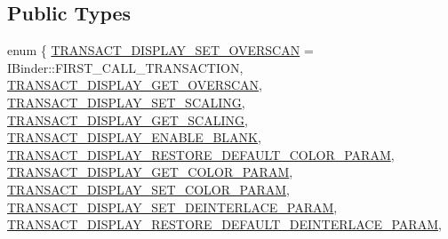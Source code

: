 \subsection*{Public Types}
\begin{DoxyCompactItemize}
\item 
enum \{ \newline
\mbox{\hyperlink{classhwcomposer_1_1BpControls_a057cb6d771c68da065640c49e3742446a985ef11557835be6b215a6b481cc8975}{T\+R\+A\+N\+S\+A\+C\+T\+\_\+\+D\+I\+S\+P\+L\+A\+Y\+\_\+\+S\+E\+T\+\_\+\+O\+V\+E\+R\+S\+C\+AN}} = I\+Binder\+:\+:F\+I\+R\+S\+T\+\_\+\+C\+A\+L\+L\+\_\+\+T\+R\+A\+N\+S\+A\+C\+T\+I\+ON, 
\mbox{\hyperlink{classhwcomposer_1_1BpControls_a057cb6d771c68da065640c49e3742446acfb53ecdb379884e8843788c2a312e8c}{T\+R\+A\+N\+S\+A\+C\+T\+\_\+\+D\+I\+S\+P\+L\+A\+Y\+\_\+\+G\+E\+T\+\_\+\+O\+V\+E\+R\+S\+C\+AN}}, 
\mbox{\hyperlink{classhwcomposer_1_1BpControls_a057cb6d771c68da065640c49e3742446acd6fb8651f02533f7f7a92d0642d9a0d}{T\+R\+A\+N\+S\+A\+C\+T\+\_\+\+D\+I\+S\+P\+L\+A\+Y\+\_\+\+S\+E\+T\+\_\+\+S\+C\+A\+L\+I\+NG}}, 
\mbox{\hyperlink{classhwcomposer_1_1BpControls_a057cb6d771c68da065640c49e3742446ad8d27d03f7cca04781cb7c481a1a91d6}{T\+R\+A\+N\+S\+A\+C\+T\+\_\+\+D\+I\+S\+P\+L\+A\+Y\+\_\+\+G\+E\+T\+\_\+\+S\+C\+A\+L\+I\+NG}}, 
\newline
\mbox{\hyperlink{classhwcomposer_1_1BpControls_a057cb6d771c68da065640c49e3742446a6623581a2b88fb17369dd632a20106d4}{T\+R\+A\+N\+S\+A\+C\+T\+\_\+\+D\+I\+S\+P\+L\+A\+Y\+\_\+\+E\+N\+A\+B\+L\+E\+\_\+\+B\+L\+A\+NK}}, 
\mbox{\hyperlink{classhwcomposer_1_1BpControls_a057cb6d771c68da065640c49e3742446a15a087c4d488f967b1293b18951a6c02}{T\+R\+A\+N\+S\+A\+C\+T\+\_\+\+D\+I\+S\+P\+L\+A\+Y\+\_\+\+R\+E\+S\+T\+O\+R\+E\+\_\+\+D\+E\+F\+A\+U\+L\+T\+\_\+\+C\+O\+L\+O\+R\+\_\+\+P\+A\+R\+AM}}, 
\mbox{\hyperlink{classhwcomposer_1_1BpControls_a057cb6d771c68da065640c49e3742446a218cf0d49257af27d4916bbcf7974e42}{T\+R\+A\+N\+S\+A\+C\+T\+\_\+\+D\+I\+S\+P\+L\+A\+Y\+\_\+\+G\+E\+T\+\_\+\+C\+O\+L\+O\+R\+\_\+\+P\+A\+R\+AM}}, 
\mbox{\hyperlink{classhwcomposer_1_1BpControls_a057cb6d771c68da065640c49e3742446a02754bed54f3e948595d365863e6ff6c}{T\+R\+A\+N\+S\+A\+C\+T\+\_\+\+D\+I\+S\+P\+L\+A\+Y\+\_\+\+S\+E\+T\+\_\+\+C\+O\+L\+O\+R\+\_\+\+P\+A\+R\+AM}}, 
\newline
\mbox{\hyperlink{classhwcomposer_1_1BpControls_a057cb6d771c68da065640c49e3742446a32c72f6f1679760b231c841184d5420d}{T\+R\+A\+N\+S\+A\+C\+T\+\_\+\+D\+I\+S\+P\+L\+A\+Y\+\_\+\+S\+E\+T\+\_\+\+D\+E\+I\+N\+T\+E\+R\+L\+A\+C\+E\+\_\+\+P\+A\+R\+AM}}, 
\mbox{\hyperlink{classhwcomposer_1_1BpControls_a057cb6d771c68da065640c49e3742446a481d6c71408ba43adf692d5e11aa7fd7}{T\+R\+A\+N\+S\+A\+C\+T\+\_\+\+D\+I\+S\+P\+L\+A\+Y\+\_\+\+R\+E\+S\+T\+O\+R\+E\+\_\+\+D\+E\+F\+A\+U\+L\+T\+\_\+\+D\+E\+I\+N\+T\+E\+R\+L\+A\+C\+E\+\_\+\+P\+A\+R\+AM}}, 

\end{DoxyCompactItemize}
